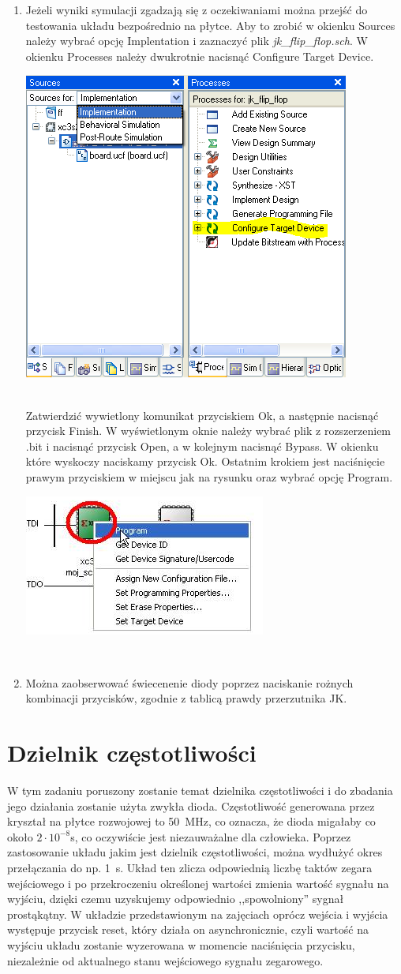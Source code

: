 \documentclass[12pt]{article}
\begin{document}
\begin{enumerate}[wide, labelwidth=!, labelindent=0pt]
\item Jeżeli wyniki symulacji zgadzają się z oczekiwaniami można przejść do testowania układu bezpośrednio na płytce. Aby to zrobić w okienku Sources należy wybrać opcję Implentation i zaznaczyć plik \textit{jk\_flip\_flop.sch}. W okienku Processes należy dwukrotnie nacisnąć Configure Target Device.
\\\centerline{\includegraphics[width=0.5\linewidth]{7.PNG}} \\
Zatwierdzić wywietlony komunikat przyciskiem Ok, a następnie nacisnąć przycisk Finish. W wyświetlonym oknie należy wybrać plik z rozszerzeniem .bit i nacisnąć przycisk Open, a w kolejnym nacisnąć Bypass. W okienku które wyskoczy naciskamy przycisk Ok. Ostatnim krokiem jest naciśnięcie prawym przyciskiem w miejscu jak na rysunku oraz wybrać opcję Program.
\\\centerline{\includegraphics[width=0.5\linewidth]{8.PNG}} \\
\item Można zaobserwować świecenenie diody poprzez naciskanie rożnych kombinacji przycisków, zgodnie z tablicą prawdy przerzutnika JK.
\end{enumerate}
\section{Dzielnik częstotliwości}
W tym zadaniu poruszony zostanie temat dzielnika częstotliwości i do zbadania jego działania zostanie użyta zwykła dioda. Częstotliwość generowana przez kryształ na płytce rozwojowej to 50~MHz, co oznacza, że dioda migałaby co około $2 \cdot 10^{-8}$s, co oczywiście jest niezauważalne dla człowieka. Poprzez zastosowanie układu jakim jest dzielnik częstotliwości, można wydłużyć okres przełączania do np. 1~s. Układ ten zlicza odpowiednią liczbę taktów zegara wejściowego i po przekroczeniu określonej wartości zmienia wartość sygnału na wyjściu, dzięki czemu uzyskujemy odpowiednio ,,spowolniony'' sygnał prostąkątny. W układzie przedstawionym na zajęciach oprócz wejścia i wyjścia występuje przycisk reset, który działa on asynchronicznie, czyli wartość na wyjściu układu zostanie wyzerowana w momencie naciśnięcia przycisku, niezależnie od aktualnego stanu wejściowego sygnału zegarowego.
\end{document}
